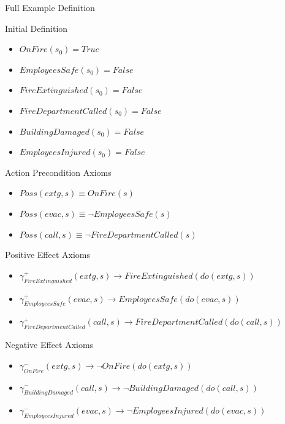 \documentclass[compress,xcolor=table]{beamer}
\begin{document}
\begin{frame}{Full Example Definition}
\small
    \begin{block}{Initial Definition}
        \begin{itemize}
            \item $OnFire(s_0)=True$
            \item $EmployeesSafe(s_0)=False$
            \item $FireExtinguished(s_0)=False$
            \item $FireDepartmentCalled(s_0)=False$
            \item $BuildingDamaged(s_0)=False$
            \item $EmployeesInjured(s_0)=False$
        \end{itemize}
    \end{block}

    \begin{block}{Action Precondition Axioms}
        \begin{itemize}
            \item $Poss(extg,s) \equiv OnFire(s)$
            \item $Poss(evac,s) \equiv \neg EmployeesSafe(s)$
            \item $Poss(call,s) \equiv \neg FireDepartmentCalled(s)$
        \end{itemize}
    \end{block}
\end{frame}

\begin{frame}
\small
    \begin{block}{Positive Effect Axioms}
        \begin{itemize}
            \item $\gamma_{FireExtinguished}^+(extg, s) \rightarrow FireExtinguished(do(extg,s))$
            \item $\gamma_{EmployeesSafe}^+(evac, s) \rightarrow EmployeesSafe(do(evac,s))$
            \item $\gamma_{FireDepartmentCalled}^+(call, s) \rightarrow FireDepartmentCalled(do(call,s))$
        \end{itemize}
    \end{block}

    \begin{block}{Negative Effect Axioms}
        \begin{itemize}
            \item $\gamma_{OnFire}^-(extg, s) \rightarrow \neg OnFire(do(extg,s))$
            \item $\gamma_{BuildingDamaged}^-(call, s) \rightarrow \neg BuildingDamaged(do(call,s))$
            \item $\gamma_{EmployeesInjured}^-(evac, s) \rightarrow \neg EmployeesInjured(do(evac,s))$
        \end{itemize}
    \end{block}
\end{frame}
\end{document}
